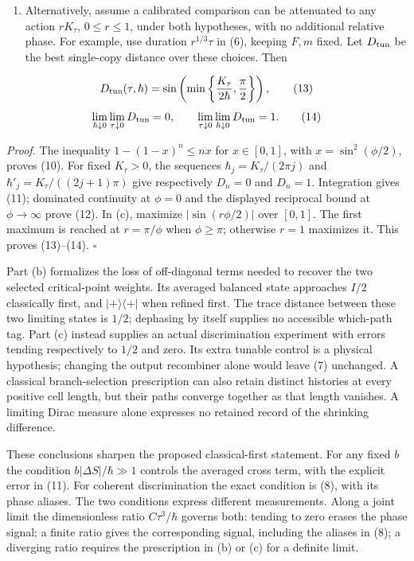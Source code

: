 \documentclass[11pt,a4paper]{article}
\newcommand{\tightlist}{\setlength{\itemsep}{0pt}\setlength{\parskip}{0pt}}
\begin{document}
\begin{enumerate}
\def\labelenumi{(\alph{enumi})}
\setcounter{enumi}{2}
\tightlist
\item
  Alternatively, assume a calibrated comparison can be attenuated to any
  action \(rK_\tau\), \(0\le r\le1\), under both hypotheses, with no
  additional relative phase. For example, use duration \(r^{1/3}\tau\)
  in (6), keeping \(F,m\) fixed. Let \(D_{\rm tun}\) be the best
  single-copy distance over these choices. Then
\end{enumerate}

\[
D_{\rm tun}(\tau,\hbar)
=\sin\left(\min\left\{\frac{K_\tau}{2\hbar},\frac\pi2\right\}\right),
\tag{13}
\] \[
\lim_{\hbar\downarrow0}\lim_{\tau\downarrow0}D_{\rm tun}=0,
\qquad
\lim_{\tau\downarrow0}\lim_{\hbar\downarrow0}D_{\rm tun}=1.
\tag{14}
\]

\emph{Proof.} The inequality \(1-(1-x)^n\le nx\) for \(x\in[0,1]\), with
\(x=\sin^2(\phi/2)\), proves (10). For fixed \(K_\tau>0\), the sequences
\(\hbar_j=K_\tau/(2\pi j)\) and \(\hbar'_j=K_\tau/((2j+1)\pi)\) give
respectively \(D_n=0\) and \(D_n=1\). Integration gives (11); dominated
continuity at \(\phi=0\) and the displayed reciprocal bound at
\(\phi\to\infty\) prove (12). In (c), maximize \(|\sin(r\phi/2)|\) over
\([0,1]\). The first maximum is reached at \(r=\pi/\phi\) when
\(\phi\ge\pi\); otherwise \(r=1\) maximizes it. This proves (13)--(14).
\(\square\)

Part (b) formalizes the loss of off-diagonal terms needed to recover the
two selected critical-point weights. Its averaged balanced state
approaches \(I/2\) classically first, and \(|+\rangle\langle+|\) when
refined first. The trace distance between these two limiting states is
\(1/2\); dephasing by itself supplies no accessible which-path tag. Part
(c) instead supplies an actual discrimination experiment with errors
tending respectively to \(1/2\) and zero. Its extra tunable control is a
physical hypothesis; changing the output recombiner alone would leave
(7) unchanged. A classical branch-selection prescription can also retain
distinct histories at every positive cell length, but their paths
converge together as that length vanishes. A limiting Dirac measure
alone expresses no retained record of the shrinking difference.

These conclusions sharpen the proposed classical-first statement. For
any fixed \(b\) the condition \(b|\Delta S|/\hbar\gg1\) controls the
averaged cross term, with the explicit error in (11). For coherent
discrimination the exact condition is (8), with its phase aliases. The
two conditions express different measurements. Along a joint limit the
dimensionless ratio \(C\tau^3/\hbar\) governs both: tending to zero
erases the phase signal; a finite ratio gives the corresponding signal,
including the aliases in (8); a diverging ratio requires the
prescription in (b) or (c) for a definite limit.
\end{document}
